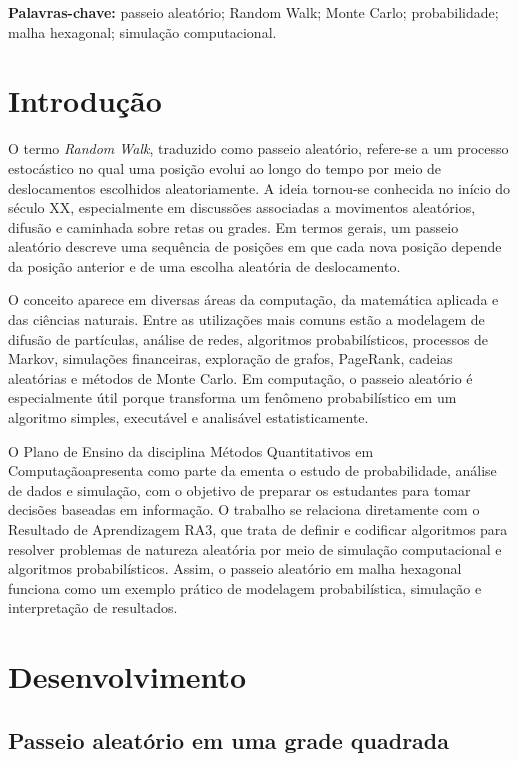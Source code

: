 \documentclass[12pt,a4paper]{article}
\newcommand{\disciplina}{Métodos Quantitativos em Computação}
\begin{document}
\textbf{Palavras-chave:} passeio aleatório; Random Walk; Monte Carlo; probabilidade; malha hexagonal; simulação computacional.

\newpage
\tableofcontents

\newpage
\section{Introdução}

O termo \textit{Random Walk}, traduzido como passeio aleatório, refere-se a um processo estocástico no qual uma posição evolui ao longo do tempo por meio de deslocamentos escolhidos aleatoriamente. A ideia tornou-se conhecida no início do século XX, especialmente em discussões associadas a movimentos aleatórios, difusão e caminhada sobre retas ou grades. Em termos gerais, um passeio aleatório descreve uma sequência de posições em que cada nova posição depende da posição anterior e de uma escolha aleatória de deslocamento.

O conceito aparece em diversas áreas da computação, da matemática aplicada e das ciências naturais. Entre as utilizações mais comuns estão a modelagem de difusão de partículas, análise de redes, algoritmos probabilísticos, processos de Markov, simulações financeiras, exploração de grafos, PageRank, cadeias aleatórias e métodos de Monte Carlo. Em computação, o passeio aleatório é especialmente útil porque transforma um fenômeno probabilístico em um algoritmo simples, executável e analisável estatisticamente.

O Plano de Ensino da disciplina \disciplina apresenta como parte da ementa o estudo de probabilidade, análise de dados e simulação, com o objetivo de preparar os estudantes para tomar decisões baseadas em informação. O trabalho se relaciona diretamente com o Resultado de Aprendizagem RA3, que trata de definir e codificar algoritmos para resolver problemas de natureza aleatória por meio de simulação computacional e algoritmos probabilísticos. Assim, o passeio aleatório em malha hexagonal funciona como um exemplo prático de modelagem probabilística, simulação e interpretação de resultados.

\section{Desenvolvimento}

\subsection{Passeio aleatório em uma grade quadrada}
\end{document}

